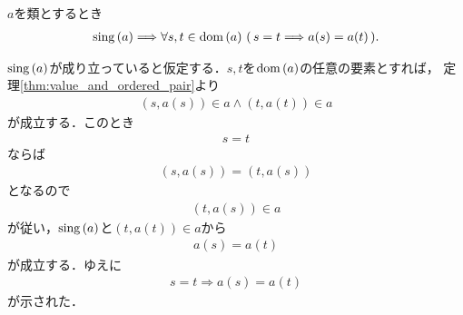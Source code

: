 	\begin{screen}
		\begin{thm}
		\label{thm:uniqueness_of_values}
			$a$を類とするとき
			\begin{align}
				\operatorname*{sing} \left(a\right) \Longrightarrow
				\forall s,t \in \operatorname*{dom} \left(a\right)\, (\, s=t \Longrightarrow a(s) = a(t)\, ).
			\end{align}
		\end{thm}
	\end{screen}
	
	\begin{sketch}%
		$\operatorname*{sing} \left(a\right)$が成り立っていると仮定する．$s,t$を$\operatorname*{dom} \left(a\right)$の任意の要素とすれば，
		定理\ref{thm:value_and_ordered_pair}より
		\begin{align}
			(s,a(s)) \in a \wedge (t,a(t)) \in a
		\end{align}
		が成立する．このとき
		\begin{align}
			s = t
		\end{align}
		ならば
		\begin{align}
			(s,a(s)) = (t,a(s))
		\end{align}
		となるので
		\begin{align}
			(t,a(s)) \in a
		\end{align}
		が従い，$\operatorname*{sing} \left(a\right)$と$(t,a(t)) \in a$から
		\begin{align}
			a(s) = a(t)
		\end{align}
		が成立する．ゆえに
		\begin{align}
			s=t \Longrightarrow a(s) = a(t)
		\end{align}
		が示された．
		\QED
	\end{sketch}
	
